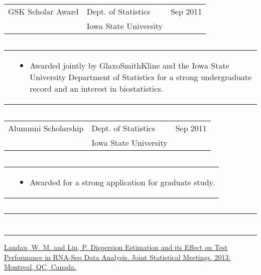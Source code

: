 \documentclass{article}
\newcommand{\q}{$\quad$ \newline}
\newcommand{\vl}{4.25}
\newcommand{\wl}{8.4}
\newcommand{\ww}{13}
\newcommand{\myrule}{\noindent \rule{\textwidth}{1pt}}
\begin{document}
\noindent \begin{tabular}{@{}p{\vl cm}p{\wl cm}l@{}}
GSK Scholar Award & Dept. of Statistics & Sep 2011 \\
& Iowa State University &
\end{tabular} \q

\noindent \begin{tabular}{@{}p{\vl cm}p{\ww cm}@{}}
&\begin{itemize}
\item Awarded jointly by GlaxoSmithKline and the Iowa State University Department of Statistics for a strong undergraduate record and an interest in biostatistics.
\end{itemize}
\end{tabular} \q 

\noindent \begin{tabular}{@{}p{\vl cm}p{\wl cm}l@{}}
Alummni Scholarship & Dept. of Statistics & Sep 2011 \\
& Iowa State University &
\end{tabular} \q

\noindent \begin{tabular}{@{}p{\vl cm}p{\ww cm}@{}}
& \begin{itemize}
 \item Awarded for a strong application for graduate study.
\end{itemize}
\end{tabular} \q 





\myrule
\nocite{*}

\noindent  \q


 \q
\myrule

\noindent\href{http://will-landau.com/research/jsm2013.pdf}{Landau, W. M. and Liu, P. Dispersion Estimation and its Effect on Test Performance in RNA-Seq Data Analysis. Joint Statistical Meetings, 2013. Montreal, QC, Canada.}\q \q
\end{document}
